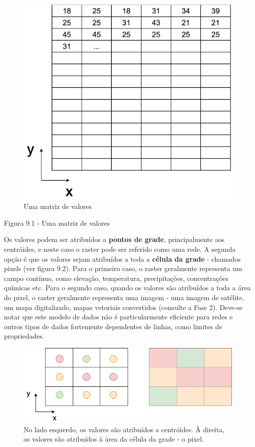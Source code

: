 \documentclass[
  portuguese,
]{krantz}
\begin{document}
\begin{figure}
\centering
\includegraphics{media/modulo9/fig91.png}
\caption{Uma matriz de valores}
\end{figure}

Figura 9.1 - Uma matriz de valores

Os valores podem ser atribuídos a \textbf{pontos de grade}, principalmente aos centróides, e neste caso o raster pode ser referido como uma rede. A segunda opção é que os valores sejam atribuídos a toda a \textbf{célula da grade} - chamados pixels (ver figura 9.2). Para o primeiro caso, o raster geralmente representa um campo contínuo, como elevação, temperatura, precipitações, concentrações químicas etc. Para o segundo caso, quando os valores são atribuídos a toda a área do pixel, o raster geralmente representa uma imagem - uma imagem de satélite, um mapa digitalizado, mapas vetoriais convertidos (consulte a Fase 2). Deve-se notar que este modelo de dados não é particularmente eficiente para redes e outros tipos de dados fortemente dependentes de linhas, como limites de propriedades.

\begin{figure}
\centering
\includegraphics{media/modulo9/fig92.png}
\caption{No lado esquerdo, os valores são atribuídos a centróides. À direita, os valores são atribuídos à área da célula da grade - o pixel.}
\end{figure}
\end{document}
